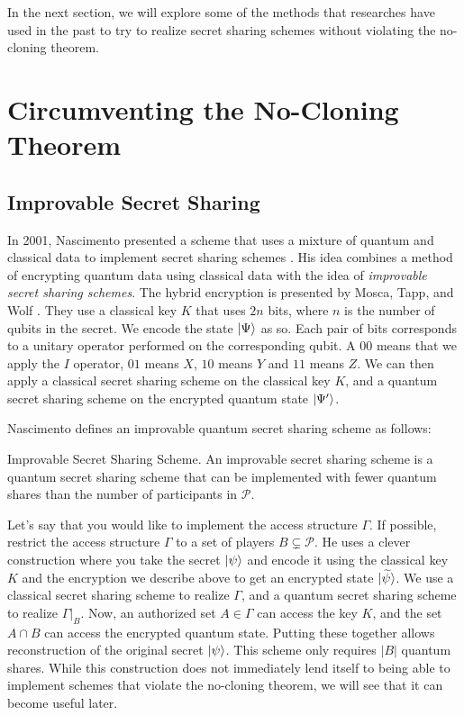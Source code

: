 In the next section, we will explore some of the methods that researches have used in the past to try to realize secret sharing schemes without violating the no-cloning theorem.

\section{Circumventing the No-Cloning Theorem}

\subsection{Improvable Secret Sharing}

In 2001, Nascimento presented a scheme that uses a mixture of quantum and classical data to implement secret sharing schemes \cite{nascimento_improving_2001}. His idea combines a method of encrypting quantum data using classical data with the idea of \textit{improvable secret sharing schemes}. The hybrid encryption is presented by Mosca, Tapp, and Wolf \cite{mosca2000private}. They use a classical key $K$ that uses $2n$ bits, where $n$ is the number of qubits in the secret. We encode the state $\ket{\Psi}$ as so. Each pair of bits corresponds to a unitary operator performed on the corresponding qubit. A $00$ means that we apply the $I$ operator, $01$ means $X$, $10$ means $Y$ and $11$ means $Z$. We can then apply a classical secret sharing scheme on the classical key $K$, and a quantum secret sharing scheme on the encrypted quantum state $\ket{\Psi '}$.

Nascimento defines an improvable quantum secret sharing scheme as follows:

\begin{definition}{Improvable Secret Sharing Scheme.}
    \label{defn:improvable}
    An improvable secret sharing scheme is a quantum secret sharing scheme that can be implemented with fewer quantum shares than the number of participants in $\mathcal{P}$.
\end{definition}

Let's say that you would like to implement the access structure $\Gamma$. If possible, restrict the access structure $\Gamma$ to a set of players $B \subsetneq \mathcal{P}$. He uses a clever construction where you take the secret $\ket{\psi}$ and encode it using the classical key $K$ and the encryption we describe above to get an encrypted state $\ket{\widetilde{\psi}}$. We use a classical secret sharing scheme to realize $\Gamma$, and a quantum secret sharing scheme to realize $\Gamma |_B$. Now, an authorized set $A \in \Gamma$ can access the key $K$, and the set $A \cap B$ can access the encrypted quantum state. Putting these together allows reconstruction of the original secret $\ket{\psi}$. This scheme only requires $|B|$ quantum shares. While this construction does not immediately lend itself to being able to implement schemes that violate the no-cloning theorem, we will see that it can become useful later.

